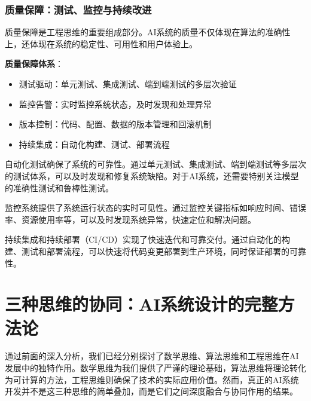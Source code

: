 %
%

\subsubsection{质量保障：测试、监控与持续改进}

质量保障是工程思维的重要组成部分。AI系统的质量不仅体现在算法的准确性上，还体现在系统的稳定性、可用性和用户体验上。

\textbf{质量保障体系}：
 \begin{itemize}
 \item 测试驱动：单元测试、集成测试、端到端测试的多层次验证
 \item 监控告警：实时监控系统状态，及时发现和处理异常
 \item 版本控制：代码、配置、数据的版本管理和回滚机制
 \item 持续集成：自动化构建、测试、部署流程
 \end{itemize}

自动化测试确保了系统的可靠性。通过单元测试、集成测试、端到端测试等多层次的测试体系，可以及时发现和修复系统缺陷。对于AI系统，还需要特别关注模型的准确性测试和鲁棒性测试。

监控系统提供了系统运行状态的实时可见性。通过监控关键指标如响应时间、错误率、资源使用率等，可以及时发现系统异常，快速定位和解决问题。

持续集成和持续部署（CI/CD）实现了快速迭代和可靠交付。通过自动化的构建、测试和部署流程，可以快速将代码变更部署到生产环境，同时保证部署的可靠性。

\section{三种思维的协同：AI系统设计的完整方法论}

通过前面的深入分析，我们已经分别探讨了数学思维、算法思维和工程思维在AI发展中的独特作用。数学思维为我们提供了严谨的理论基础，算法思维将理论转化为可计算的方法，工程思维则确保了技术的实际应用价值。然而，真正的AI系统开发并不是这三种思维的简单叠加，而是它们之间深度融合与协同作用的结果。

